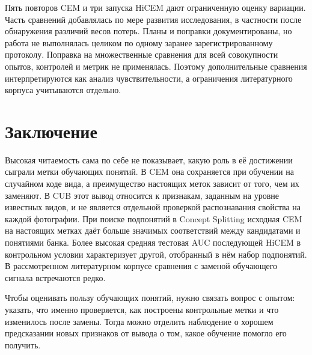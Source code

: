 \documentclass[10pt]{article}
\begin{document}
Пять повторов CEM и три запуска HiCEM дают ограниченную оценку вариации. Часть сравнений добавлялась по мере развития исследования, в частности после обнаружения различий весов потерь. Планы и поправки документированы, но работа не выполнялась целиком по одному заранее зарегистрированному протоколу. Поправка на множественные сравнения для всей совокупности опытов, контролей и метрик не применялась. Поэтому дополнительные сравнения интерпретируются как анализ чувствительности, а ограничения литературного корпуса учитываются отдельно.

\section{Заключение}\label{sec:conclusion}
Высокая читаемость сама по себе не показывает, какую роль в её достижении сыграли метки обучающих понятий. В CEM она сохраняется при обучении на случайном коде вида, а преимущество настоящих меток зависит от того, чем их заменяют. В CUB этот вывод относится к признакам, заданным на уровне известных видов, и не является отдельной проверкой распознавания свойства на каждой фотографии. При поиске подпонятий в Concept Splitting исходная CEM на настоящих метках даёт больше значимых соответствий между кандидатами и понятиями банка. Более высокая средняя тестовая AUC последующей HiCEM в контрольном условии характеризует другой, отобранный в нём набор подпонятий. В рассмотренном литературном корпусе сравнения с заменой обучающего сигнала встречаются редко.

Чтобы оценивать пользу обучающих понятий, нужно связать вопрос с опытом: указать, что именно проверяется, как построены контрольные метки и что изменилось после замены. Тогда можно отделить наблюдение о хорошем предсказании новых признаков от вывода о том, какое обучение помогло его получить.



\clearpage
\appendix

\clearpage

\end{document}
